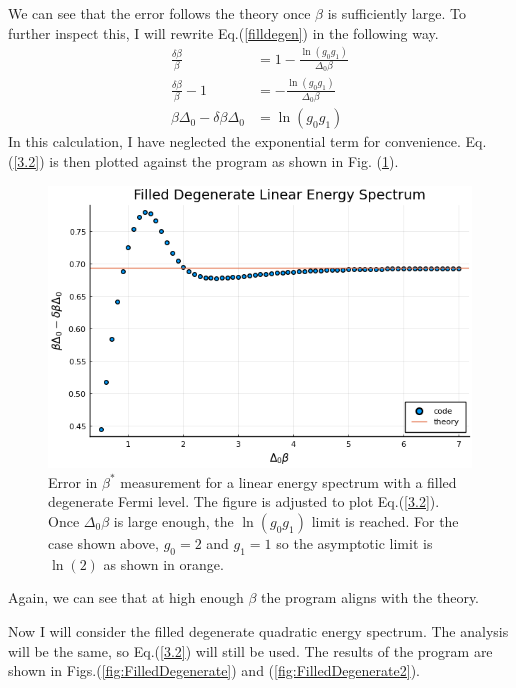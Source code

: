 We can see that the error follows the theory once $\beta$ is sufficiently large. To further inspect this, I will rewrite Eq.\@ (\ref{filldegen}) in the following way. 
\begin{align}
    \frac{\delta\beta}{\beta}&=1-\frac{\ln(g_0g_1)}{\Delta_0\beta}\nonumber\\
    \frac{\delta\beta}{\beta}-1&=-\frac{\ln(g_0g_1)}{\Delta_0\beta}\nonumber\\
    \beta\Delta_0-\delta\beta\Delta_0&=\ln(g_0g_1) \label{3.2}
\end{align}
In this calculation, I have neglected the exponential term for convenience. Eq.\@ (\ref{3.2}) is then plotted against the program as shown in Fig. (\ref{fig:FilledDegenerateLinearSpectrumAdjustedError}). 
\begin{figure}[H]
    \centering
    \includegraphics[scale=0.75]{figures/pdf/linE_filldegen_g0-2_N10_1.png}
    \caption{Error in $\beta^*$ measurement for a linear energy spectrum with a filled
degenerate Fermi level. The figure is adjusted to plot Eq.\@ (\ref{3.2}). Once $\Delta_0\beta$ is large enough, the $\ln(g_0g_1)$ limit is reached. For the case shown above, $g_0=2$ and $g_1=1$ so the asymptotic limit is $\ln(2)$ as shown in orange.}
    \label{fig:FilledDegenerateLinearSpectrumAdjustedError}
\end{figure}
Again, we can see that at high enough $\beta$ the program aligns with the theory. 

Now I will consider the filled degenerate quadratic energy spectrum. The analysis will be the same, so Eq.\@ (\ref{3.2}) will still be used. The results of the program are shown in Figs.\@ (\ref{fig:FilledDegenerate}) and (\ref{fig:FilledDegenerate2}). 

